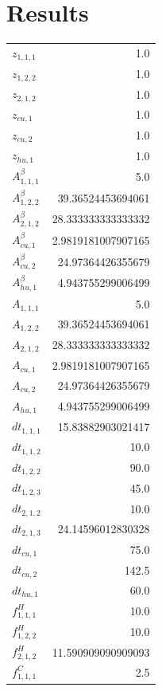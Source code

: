 \documentclass{article}%
\makeatletter
\let\mcnewpage=\newpage%
\newcommand{\TrickSupertabularIntoMulticols}{%
\renewcommand\newpage{%
\if@firstcolumn%
\hrule width\linewidth height0pt%
\columnbreak%
\else%
\mcnewpage%
\fi%
}%
}%
\makeatother
\begin{document}
\section{Results}%
\thispagestyle{plain}%
\begin{multicols*}{3}%
\TrickSupertabularIntoMulticols%
%
\begin{supertabular}{lr}%
	$z_{1,1,1}$ & 1.0 \\%
	$z_{1,2,2}$ & 1.0 \\%
	$z_{2,1,2}$ & 1.0 \\%
	$z_{cu,1}$ & 1.0 \\%
	$z_{cu,2}$ & 1.0 \\%
	$z_{hu,1}$ & 1.0 \\%
	$A_{1,1,1}^{\beta}$ & 5.0 \\%
	$A_{1,2,2}^{\beta}$ & 39.36524453694061 \\%
	$A_{2,1,2}^{\beta}$ & 28.333333333333332 \\%
	$A_{cu,1}^{\beta}$ & 2.9819181007907165 \\%
	$A_{cu,2}^{\beta}$ & 24.97364426355679 \\%
	$A_{hu,1}^{\beta}$ & 4.943755299006499 \\%
	$A_{1,1,1}$ & 5.0 \\%
	$A_{1,2,2}$ & 39.36524453694061 \\%
	$A_{2,1,2}$ & 28.333333333333332 \\%
	$A_{cu,1}$ & 2.9819181007907165 \\%
	$A_{cu,2}$ & 24.97364426355679 \\%
	$A_{hu,1}$ & 4.943755299006499 \\%
	$dt_{1,1,1}$ & 15.83882903021417 \\%
	$dt_{1,1,2}$ & 10.0 \\%
	$dt_{1,2,2}$ & 90.0 \\%
	$dt_{1,2,3}$ & 45.0 \\%
	$dt_{2,1,2}$ & 10.0 \\%
	$dt_{2,1,3}$ & 24.14596012830328 \\%
	$dt_{cu,1}$ & 75.0 \\%
	$dt_{cu,2}$ & 142.5 \\%
	$dt_{hu,1}$ & 60.0 \\%
	$f_{1,1,1}^{H}$ & 10.0 \\%
	$f_{1,2,2}^{H}$ & 10.0 \\%
	$f_{2,1,2}^{H}$ & 11.590909090909093 \\%
	$f_{1,1,1}^{C}$ & 2.5 \\%

\end{supertabular}
\end{multicols*}
\end{document}
